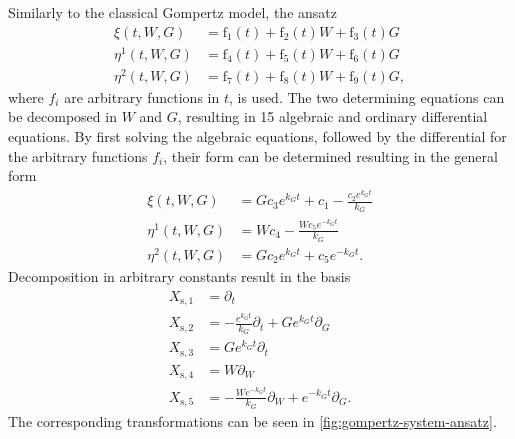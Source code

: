 Similarly to the classical Gompertz model, the ansatz
\begin{align}
  \xi{\left(t,W,G \right)} &= \operatorname{f_{1}}{\left(t \right)} + \operatorname{f_{2}}{\left(t \right)} W + \operatorname{f_{3}}{\left(t \right)} G \\
  \eta^{1}{\left(t,W,G \right)} &= \operatorname{f_{4}}{\left(t \right)} + \operatorname{f_{5}}{\left(t \right)} W + \operatorname{f_{6}}{\left(t \right)} G\\
  \eta^{2}{\left(t,W,G \right)} &= \operatorname{f_{7}}{\left(t \right)} + \operatorname{f_{8}}{\left(t \right)} W + \operatorname{f_{9}}{\left(t \right)} G,
\end{align}
where \(f_i\) are arbitrary functions in \(t\), is used.
The two determining equations can be decomposed in \(W\) and \(G\), resulting in 15 algebraic and ordinary differential equations.
By first solving the algebraic equations, followed by the differential for the arbitrary functions \(f_i\), their form can be determined resulting in the general form
\begin{align}
  \xi{\left(t,W,G \right)} &= G c_{3} e^{k_{G} t} + c_{1} - \frac{c_{2} e^{k_{G} t}}{k_{G}} \\
  \eta^{1}{\left(t,W,G \right)} &= W c_{4} - \frac{W c_{5} e^{- k_{G} t}}{k_{G}} \\
  \eta^{2}{\left(t,W,G \right)} &= G c_{2} e^{k_{G} t} + c_{5} e^{- k_{G} t}.
\end{align}
Decomposition in arbitrary constants result in the basis
\begin{align}
  X_{\text{s},1} &= \partial_t \\
  X_{\text{s},2} &= - \frac{e^{k_{G} t}}{k_{G}} \partial_t + G e^{k_{G} t} \partial_G \\
  X_{\text{s},3} &= G e^{k_{G} t} \partial_t \\
  X_{\text{s},4} &= W \partial_W \\
  X_{\text{s},5} &= - \frac{W e^{- k_{G} t}}{k_{G}} \partial_W + e^{- k_{G} t} \partial_G.
\end{align}
The corresponding transformations can be seen in \cref{fig:gompertz-system-ansatz}.
